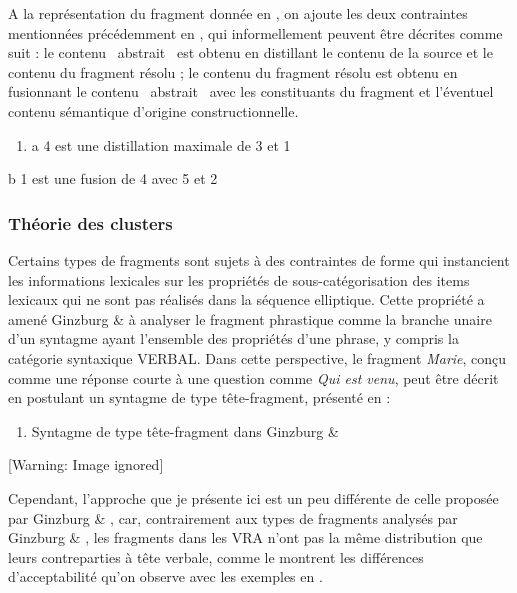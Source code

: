 A la représentation du fragment donnée en , on ajoute les deux contraintes mentionnées précédemment  en , qui informellement peuvent être décrites comme suit : le contenu {\guillemotleft}~abstrait~{\guillemotright} est obtenu en distillant le contenu de la source et le contenu du fragment résolu ; le contenu du fragment résolu est obtenu en fusionnant le contenu {\guillemotleft}~abstrait~{\guillemotright} avec les constituants du fragment et l'éventuel contenu sémantique d'origine constructionnelle.  


\begin{enumerate}
\item a  4 est une distillation maximale de 3 et 1~ 


\end{enumerate}
  b  1 est une fusion de 4 avec 5 et 2

\subsubsection{Théorie des clusters}
\label{bkm:Ref299024699}Certains types de fragments sont sujets à des contraintes de forme qui instancient les informations lexicales sur les propriétés de sous-catégorisation des items lexicaux qui ne sont pas réalisés dans la séquence elliptique. Cette propriété a amené Ginzburg \& \citet{Sag2000} à analyser le fragment phrastique comme la branche unaire d'un syntagme ayant l'ensemble des propriétés d'une phrase, y compris la catégorie syntaxique VERBAL. Dans cette perspective, le fragment \textit{Marie}, conçu comme une réponse courte à une question comme \textit{Qui est venu}, peut être décrit en postulant un syntagme de type tête-fragment, présenté en  : 


\begin{enumerate}
\item \label{bkm:Ref298867494}Syntagme de type tête-fragment dans Ginzburg \& \citet{Sag2000}


\end{enumerate}
  [Warning: Image ignored] %
 

Cependant, l'approche que je présente ici est un peu différente de celle proposée par Ginzburg \& \citet{Sag2000}, car, contrairement aux types de fragments analysés par Ginzburg \& \citet{Sag2000}, les fragments dans les VRA n'ont pas la même distribution que leurs contreparties à tête verbale, comme le montrent les différences d'acceptabilité qu'on observe avec les exemples en .



